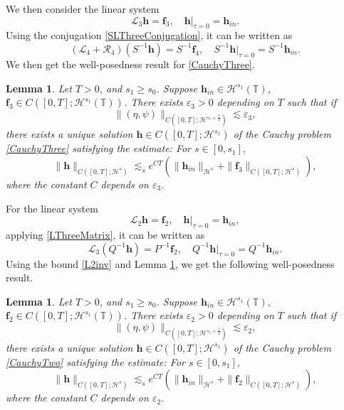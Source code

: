 \documentclass[12pt]{amsart}
\newtheorem{lemma}[theorem]{Lemma}
\theoremstyle{remark}
\theoremstyle{definition}
\numberwithin{equation}{section}
\renewcommand{\H}{{\mathcal H }}
\newcommand{\f}{\frac}
\newcommand{\T}{{\mathbb T}}
\newcommand{\mL}{\mathcal{L}}
\newcommand{\mR}{\mathcal{R}}
\begin{document}
We then consider the linear system 
\begin{equation} \label{CauchyThree}
  \mL_3  \mathbf{h} = \mathbf{f}_3, \quad \mathbf{h}|_{\tau=0} = \mathbf{h}_{in}.
\end{equation}
Using the conjugation \eqref{SLThreeConjugation}, it can be written as
\begin{equation*} 
 (\mL_4 + \mR_4) (S^{-1}\mathbf{h}) = S^{-1}\mathbf{f}_4, \quad S^{-1}\mathbf{h}|_{\tau=0} = S^{-1}\mathbf{h}_{in}.  
\end{equation*}
We then get the well-posedness result for \eqref{CauchyThree}.


\begin{lemma} \label{t:CauchyThree}
Let $T>0$, and $s_1\geq s_0$.
Suppose $\mathbf{h}_{in} \in \H^{s_1}(\T)$, $\mathbf{f}_3\in C([0,T]; \H^{s_1}(\T))$.
There exists $\varepsilon_3>0$ depending on $T$ such that if 
\begin{equation*}
 \|(\eta, \psi)\|_{C([0,T]; \H^{s_1+\f52})} \lesssim \varepsilon_3 ,
\end{equation*}
there exists a unique solution $\mathbf{h}\in C([0,T]; \H^{s_1})$ of the Cauchy problem \eqref{CauchyThree} satisfying the estimate:
For $s\in [0, s_1]$, 
\begin{equation} \label{mR3EnergyEst}
 \| \mathbf{h}\|_{C([0,T]; \H^s)} \lesssim_s e^{CT}\left(\|\mathbf{h}_{in} \|_{\H^s} + \| \mathbf{f}_3\|_{C([0,T]; \H^s)}\right), 
\end{equation}
where the constant $C$ depends on $\varepsilon_3$.
\end{lemma}

For the linear system 
\begin{equation} \label{CauchyTwo}
  \mL_2  \mathbf{h} = \mathbf{f}_2, \quad \mathbf{h}|_{\tau=0} = \mathbf{h}_{in},
\end{equation}
applying \eqref{LThreeMatrix}, it can be written as
\begin{equation*} 
\mL_3 (Q^{-1}\mathbf{h}) = P^{-1}\mathbf{f}_2, \quad Q^{-1}\mathbf{h}|_{\tau=0} = Q^{-1}\mathbf{h}_{in}.
 \end{equation*}
Using the bound \eqref{L2inv} and Lemma \ref{t:CauchyThree}, we get the following well-posedness result.
\begin{lemma} \label{t:CauchyTwo}
Let $T>0$, and $s_1\geq s_0$.
Suppose $\mathbf{h}_{in} \in \H^{s_1}(\T)$, $\mathbf{f}_2\in C([0,T]; \H^{s_1}(\T))$.
There exists $\varepsilon_2>0$ depending on $T$ such that if 
\begin{equation*}
 \|(\eta, \psi)\|_{C([0,T]; \H^{s_1+\f52})} \lesssim \varepsilon_2 ,
\end{equation*}
there exists a unique solution $\mathbf{h}\in C([0,T]; \H^{s_1})$ of the Cauchy problem \eqref{CauchyTwo} satisfying the estimate:
For $s\in [0, s_1]$, 
\begin{equation} \label{mR2EnergyEst}
 \| \mathbf{h}\|_{C([0,T]; \H^s)} \lesssim_s e^{CT}\left(\|\mathbf{h}_{in} \|_{\H^s} + \| \mathbf{f}_2\|_{C([0,T]; \H^s)}\right), 
\end{equation}
where the constant $C$ depends on $\varepsilon_2$.
\end{lemma}
\end{document}
